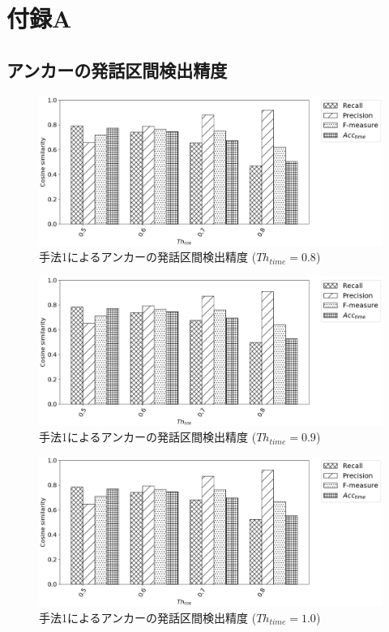 \appendix
\chapter*{付録A}
\section*{アンカーの発話区間検出精度}
\begin{figure}[H]
  \begin{center}
    \includegraphics[scale=0.5]{./figure/prob1_08.eps}
  \end{center}
  \caption{手法1によるアンカーの発話区間検出精度 ($Th_{time}=0.8$)}
\end{figure}

\begin{figure}[H]
  \begin{center}
    \includegraphics[scale=0.5]{./figure/prob1_09.eps}
  \end{center}
  \caption{手法1によるアンカーの発話区間検出精度 ($Th_{time}=0.9$)}
\end{figure}

\begin{figure}[H]
  \begin{center}
    \includegraphics[scale=0.5]{./figure/prob1_10.eps}
  \end{center}
  \caption{手法1によるアンカーの発話区間検出精度 ($Th_{time}=1.0$)}
\end{figure}

